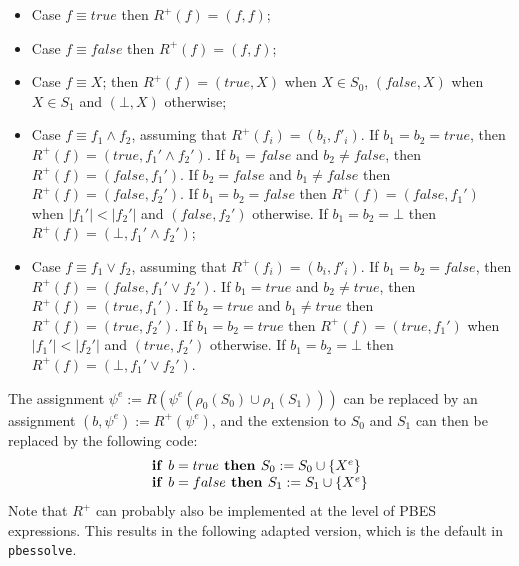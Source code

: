 \documentclass{article}
\newcommand{\If}{\text{\textbf{if }}}
\newcommand{\Then}{\text{\textbf{ then }}}
\begin{document}
\begin{itemize}
\item Case $f \equiv true$  then $R^+(f) = (f,f)$;
\item Case $f \equiv false$ then $R^+(f) = (f,f)$;
\item Case $f \equiv X$; then $R^+(f) =(true,X)$ when $X \in S_0$, $(false, X)$ when $X \in S_1$ and $(\bot, X)$ otherwise;
\item Case $f \equiv f_1 \wedge f_2$, assuming that $R^+(f_i) = (b_i,f'_i)$. If $b_1 = b_2 = true$, then
$R^+(f) = (true, f_1' \wedge f_2')$. If $b_1 = false$ and $b_2 \neq false$, then $R^+(f) = (false, f_1')$. 
If $b_2 = false$ and $b_1 \neq false$ then $R^+(f) = (false,f_2')$. If $b_1 = b_2 = false$ then
$R^+(f) = (false, f_1')$ when $|f_1'| < |f_2'|$ and $(false,f_2')$ otherwise. If $b_1 = b_2 = \bot$ then
$R^+(f) = (\bot, f_1' \wedge f_2')$;

\item Case $f \equiv f_1 \vee f_2$,  assuming that $R^+(f_i) = (b_i,f'_i)$. If $b_1 = b_2 = false$, then
$R^+(f) = (false, f_1' \vee f_2')$. If $b_1 = true$ and $b_2 \neq true$, then $R^+(f) = (true, f_1')$. 
If $b_2 = true$ and $b_1 \neq true$ then $R^+(f) = (true,f_2')$. If $b_1 = b_2 = true$ then
$R^+(f) = (true, f_1')$ when $|f_1'| < |f_2'|$ and $(true,f_2')$ otherwise. If $b_1 = b_2 = \bot$ then
$R^+(f) = (\bot, f_1' \vee f_2')$.
\end{itemize}

The assignment $\psi^e := R(\psi^e(\rho_0(S_0) \cup \rho_1(S_1)))$ can be replaced by an assignment
$(b,\psi^e) := R^+(\psi^e)$, and the extension to $S_0$ and $S_1$ can then be replaced by the
following code:
\[
\begin{array}{l}
\If b = true \Then S_0 := S_0 \cup \{ X^e \} \\
\If b = false \Then S_1 := S_1 \cup \{ X^e \} \\
\end{array}
\]
Note that $R^+$ can probably also be implemented at the level of PBES expressions. This results in the following adapted version, which is the default in \texttt{pbessolve}.
\end{document}
